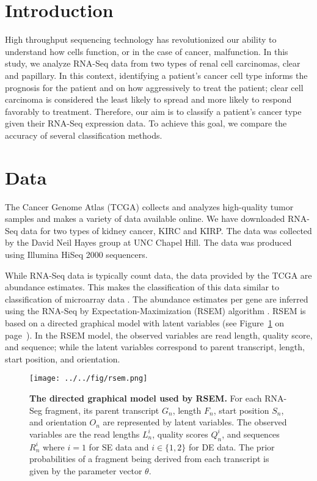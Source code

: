 \section{Introduction}

High throughput sequencing technology has revolutionized our ability to
understand how cells function, or in the case of cancer, malfunction. In this
study, we analyze RNA-Seq data from two types of renal cell carcinomas, clear
and papillary.  In this context, identifying a patient's cancer cell type
informs the prognosis for the patient and on how aggressively to treat the
patient; clear cell carcinoma is considered the least likely to spread and more
likely to respond favorably to treatment. Therefore, our aim is to classify a
patient's cancer type given their RNA-Seq expression data. To achieve this
goal, we compare the accuracy of several classification methods.

\section{Data}

The Cancer Genome Atlas (TCGA) collects and analyzes high-quality tumor samples
and makes a variety of data available online. We have downloaded RNA-Seq data
for two types of kidney cancer, KIRC and KIRP. The data was collected by the
David Neil Hayes group at UNC Chapel Hill. The data was produced using Illumina
HiSeq 2000 sequencers. 

While RNA-Seq data is typically count data, the data provided by the TCGA are
abundance estimates.  This makes the classification of this data similar to
classification of microarray data \cite{dudoitclass}.  The abundance estimates
per gene are inferred using the RNA-Seq by Expectation-Maximization (RSEM)
algorithm \cite{li2011rsem}.  RSEM is based on a directed graphical model with
latent variables (see Figure~\ref{fig:rsem} on page~\pageref{fig:rsem}). In the
RSEM model, the observed variables are read length, quality score, and
sequence; while the latent variables correspond to parent transcript, length,
start position, and orientation.

\begin{figure}[H]
  \centering
    \texttt{[image: ../../fig/rsem.png]}
\caption{\textbf{The directed graphical model used by RSEM.} 
For each RNA-Seg fragment,
its parent transcript $G_n$, length $F_n$, start position  $S_n$, and orientation $O_n$
are represented by latent variables. The observed variables are the read lengths
$L_n^i$, quality scores $Q_n^i$, and sequences $R_n^i$ where $i = 1$ for SE data and
$i \in \{1,2\}$ for DE data. The prior probabilities of a
fragment being derived from each transcript is given by the parameter vector $\theta$.}
   \label{fig:rsem}
\end{figure}

